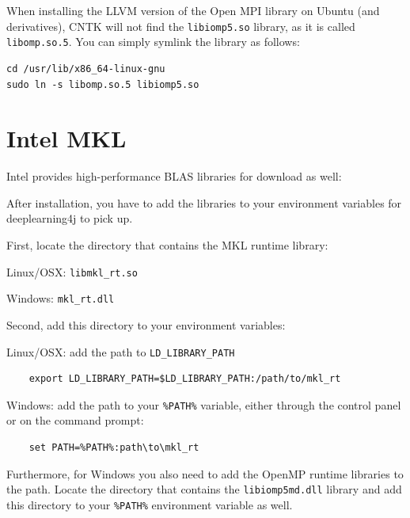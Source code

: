 \documentclass[a4paper]{book}
\begin{document}
When installing the LLVM version of the Open MPI library on Ubuntu (and
derivatives), CNTK will not find the \texttt{libiomp5.so} library, as it
is called \texttt{libomp.so.5}. You can simply symlink the library as
follows:
\begin{verbatim}
cd /usr/lib/x86_64-linux-gnu
sudo ln -s libomp.so.5 libiomp5.so
\end{verbatim}

\chapter{Intel MKL}
Intel provides high-performance BLAS libraries for download as well\cite{mkl}:

After installation, you have to add the libraries to your environment
variables for deeplearning4j to pick up.

\noindent First, locate the directory that contains the MKL runtime library:
\begin{tight_itemize}
  \item Linux/OSX: \texttt{libmkl\_rt.so}
  \item Windows: \texttt{mkl\_rt.dll}
\end{tight_itemize}

\noindent Second, add this directory to your environment variables:
\begin{tight_itemize}
  \item Linux/OSX: add the path to \texttt{LD\_LIBRARY\_PATH}
    \begin{verbatim}
    export LD_LIBRARY_PATH=$LD_LIBRARY_PATH:/path/to/mkl_rt
    \end{verbatim}
  \item Windows: add the path to your \texttt{\%PATH\%} variable, either
  through the control panel or on the command prompt:
    \begin{verbatim}
    set PATH=%PATH%:path\to\mkl_rt
    \end{verbatim}
\end{tight_itemize}

\noindent Furthermore, for Windows you also need to add the OpenMP runtime
libraries to the path. Locate the directory that contains the
\texttt{libiomp5md.dll} library and add this directory to your \texttt{\%PATH\%}
environment variable as well.


\end{document}
